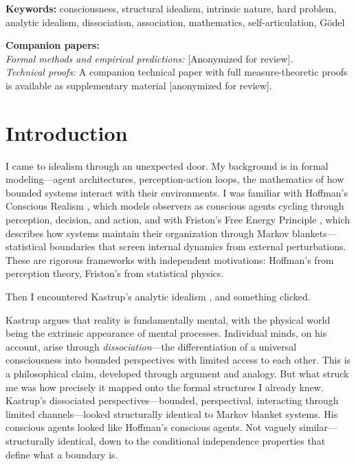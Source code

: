 \documentclass[11pt,a4paper]{article}
\theoremstyle{definition}
\theoremstyle{plain}
\theoremstyle{remark}
\begin{document}
\noindent\textbf{Keywords:} consciousness, structural idealism, intrinsic nature, hard problem, analytic idealism, dissociation, association, mathematics, self-articulation, G\"odel

\vspace{1em}
\noindent\textbf{Companion papers:}\\
\textit{Formal methods and empirical predictions:} [Anonymized for review].\\
\textit{Technical proofs:} A companion technical paper with full measure-theoretic proofs is available as supplementary material [anonymized for review].

\newpage
\tableofcontents
\newpage

\section{Introduction}\label{sec:intro}

I came to idealism through an unexpected door. My background is in formal modeling---agent architectures, perception-action loops, the mathematics of how bounded systems interact with their environments. I was familiar with Hoffman's Conscious Realism \citep{Hoffman2014,Hoffman2019}, which models observers as conscious agents cycling through perception, decision, and action, and with Friston's Free Energy Principle \citep{Friston2010,Friston2019}, which describes how systems maintain their organization through Markov blankets---statistical boundaries that screen internal dynamics from external perturbations. These are rigorous frameworks with independent motivations: Hoffman's from perception theory, Friston's from statistical physics.

Then I encountered Kastrup's analytic idealism \citep{Kastrup2019}, and something clicked.

Kastrup argues that reality is fundamentally mental, with the physical world being the extrinsic appearance of mental processes. Individual minds, on his account, arise through \textit{dissociation}---the differentiation of a universal consciousness into bounded perspectives with limited access to each other. This is a philosophical claim, developed through argument and analogy. But what struck me was how precisely it mapped onto the formal structures I already knew. Kastrup's dissociated perspectives---bounded, perspectival, interacting through limited channels---looked structurally identical to Markov blanket systems. His conscious agents looked like Hoffman's conscious agents. Not vaguely similar---structurally identical, down to the conditional independence properties that define what a boundary is.
\end{document}
